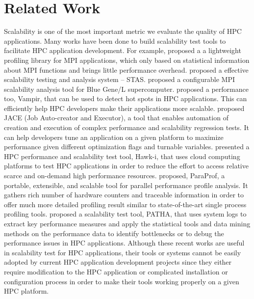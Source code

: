 \section{Related Work}
\label{related_work}
Scalability is one of the most important metric we evaluate the quality of HPC applications. Many works have been done to build scalability test tools to facilitate HPC application development. For example, \cite{vetter2005mpip} proposed a a lightweight profiling library for MPI applications, which only based on statistical information about MPI functions and brings little performance overhead. \cite{chen2006stas} proposed a effective scalability testing and analysis system -- STAS. \cite{chung2006mpi} proposed a configurable MPI scalability analysis tool for Blue Gene/L supercomputer. \cite{brunst2013custom} proposed a performance too, Vampir, that can be used to detect hot spots in HPC applications. This can efficiently help HPC developers make their applications more scalable. \cite{merchant2012tool} proposed JACE (Job Auto-creator and Executor), a tool that enables automation of creation and execution of complex performance and scalability regression tests. It can help developers tune an application on a given platform to maximize performance given different optimization flags and turnable variables. \cite{muraleedharan2012hawk} presented a HPC performance and scalability test tool, Hawk-i, that uses cloud computing platforms to test HPC applications in order to reduce the effort to access relative scarce and on-demand high performance resources. \cite{bell2003paraprof} proposed, ParaProf, a portable, extensible, and scalable tool for parallel performance profile analysis. It gathers rich number of hardware counters and traceable information in order to offer much more detailed profiling result similar to state-of-the-art single process profiling tools. \cite{yoo2015patha} proposed a scalability test tool, PATHA, that uses system logs to extract key performance measures and apply the statistical tools and data mining methods on the performance data to identify bottlenecks or to debug the performance issues in HPC applications. Although these recent works are useful in scalability test for HPC applications, their tools or systems cannot be easily adopted by current HPC application development projects since they either require modification to the HPC application or complicated installation or configuration process in order to make their tools working properly on a given HPC platform. 
